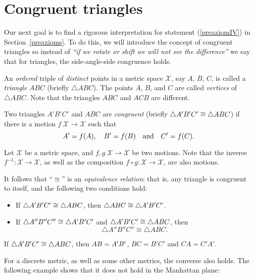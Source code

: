 \section{Congruent triangles}
\label{sec:cong-triangles}

Our next goal is to find a rigorous interpretation for statement (\ref{preaxiomIV}) in Section~\ref{preaxioms}.
To do this, we will introduce the concept of congruent triangles
so instead of \textit{``if we rotate or shift we will not see the difference''} we say that for triangles, the side-angle-side congruence holds.

An \textit{ordered} triple of \textit{distinct} points in a metric space $\mathcal{X}$, 
say $A$, $B$, $C$,
is called a \emph{triangle $ABC$}\label{page:def:triangle} (briefly $\triangle A B C$).
The points $A$, $B$, and $C$ are called \emph{vertices} of $\triangle ABC$.
Note that the triangles $A B C$ and $A C B$ are different.

Two triangles $A' B' C'$ and $A B C$ are  
\emph{congruent}
(briefly  $\triangle A' B' C'\cong\triangle A B C$) if there is a motion $f\:\mathcal{X}\to\mathcal{X}$ such that 
\[A'=f(A),
\quad
B'=f(B)
\quad
\text{and}
\quad
C'=f(C).\]

Let $\mathcal X$ be a metric space,
and $f,g\:\mathcal X\to\mathcal X$ be two motions.
Note that the inverse $f^{-1}:\mathcal X\to\mathcal X$,
as well as the composition $f\circ g:\mathcal X\to\mathcal X$,
are also motions.

It follows that ``$\cong$'' is an \emph{equivalence relation};
that is, any triangle is congruent to itself, 
and the following two conditions hold:
\begin{itemize} 
\item If $\triangle A' B' C'\cong\triangle A B C$, then $\triangle A B C\cong\triangle A' B' C'$.
\item If $\triangle A'' B'' C''\cong\triangle A' B' C'$ and $\triangle A' B' C'\cong\triangle A B C$,
then 
$$\triangle A'' B'' C''\cong\triangle A B C.$$
\end{itemize}

If $\triangle A' B' C'\cong\triangle A B C$,
then $AB=A'B'$,
$BC=B'C'$ and $CA=C'A'$.

For a discrete metric, as well as some other metrics, 
the converse also holds.
The following example shows that it does not hold in the Manhattan plane:

